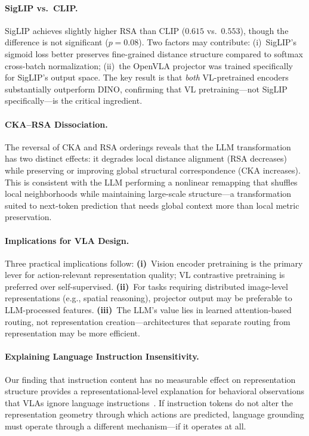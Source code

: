 \documentclass[letterpaper]{article}
\begin{document}
\paragraph{SigLIP vs.\ CLIP.}
SigLIP achieves slightly higher RSA than CLIP ($0.615$ vs.\ $0.553$), though the difference is not significant ($p{=}0.08$).
Two factors may contribute: (i)~SigLIP's sigmoid loss better preserves fine-grained distance structure compared to softmax cross-batch normalization; (ii)~the OpenVLA projector was trained specifically for SigLIP's output space.
The key result is that \emph{both} VL-pretrained encoders substantially outperform DINO, confirming that VL pretraining---not SigLIP specifically---is the critical ingredient.

\paragraph{CKA--RSA Dissociation.}
The reversal of CKA and RSA orderings reveals that the LLM transformation has two distinct effects: it degrades local distance alignment (RSA decreases) while preserving or improving global structural correspondence (CKA increases).
This is consistent with the LLM performing a nonlinear remapping that shuffles local neighborhoods while maintaining large-scale structure---a transformation suited to next-token prediction that needs global context more than local metric preservation.

\paragraph{Implications for VLA Design.}
Three practical implications follow:
\textbf{(i)}~Vision encoder pretraining is the primary lever for action-relevant representation quality; VL contrastive pretraining is preferred over self-supervised.
\textbf{(ii)}~For tasks requiring distributed image-level representations (e.g., spatial reasoning), projector output may be preferable to LLM-processed features.
\textbf{(iii)}~The LLM's value lies in learned attention-based routing, not representation creation---architectures that separate routing from representation may be more efficient.

\paragraph{Explaining Language Instruction Insensitivity.}
Our finding that instruction content has no measurable effect on representation structure provides a representational-level explanation for behavioral observations that VLAs ignore language instructions~\citep{hou2026langgap,fei2025liberoplus}.
If instruction tokens do not alter the representation geometry through which actions are predicted, language grounding must operate through a different mechanism---if it operates at all.
\end{document}
